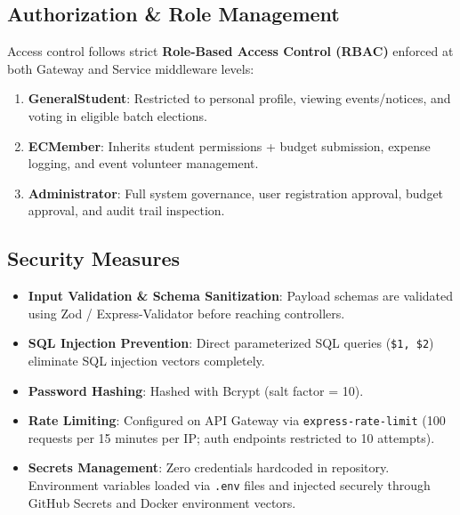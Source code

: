 \documentclass[12pt, a4paper]{article}
\begin{document}
\subsection{Authorization \& Role Management}
Access control follows strict \textbf{Role-Based Access Control (RBAC)} enforced at both Gateway and Service middleware levels:
\begin{enumerate}
    \item \textbf{GeneralStudent}: Restricted to personal profile, viewing events/notices, and voting in eligible batch elections.
    \item \textbf{ECMember}: Inherits student permissions + budget submission, expense logging, and event volunteer management.
    \item \textbf{Administrator}: Full system governance, user registration approval, budget approval, and audit trail inspection.
\end{enumerate}

\subsection{Security Measures}
\begin{itemize}
    \item \textbf{Input Validation \& Schema Sanitization}: Payload schemas are validated using Zod / Express-Validator before reaching controllers.
    \item \textbf{SQL Injection Prevention}: Direct parameterized SQL queries (\texttt{\$1, \$2}) eliminate SQL injection vectors completely.
    \item \textbf{Password Hashing}: Hashed with Bcrypt (salt factor = 10).
    \item \textbf{Rate Limiting}: Configured on API Gateway via \texttt{express-rate-limit} (100 requests per 15 minutes per IP; auth endpoints restricted to 10 attempts).
    \item \textbf{Secrets Management}: Zero credentials hardcoded in repository. Environment variables loaded via \texttt{.env} files and injected securely through GitHub Secrets and Docker environment vectors.
\end{itemize}
\end{document}
